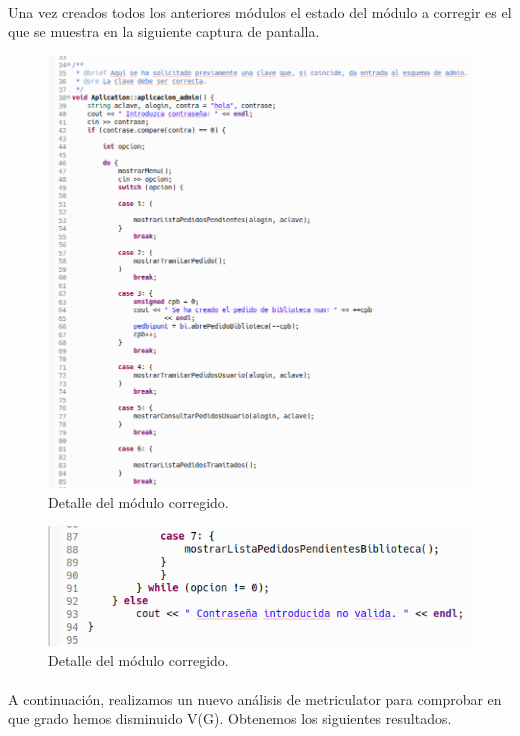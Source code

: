 			\paragraph{}Una vez creados todos los anteriores módulos el estado del módulo a corregir es el que se muestra en la siguiente captura de pantalla.
			
			\begin{figure}[H]
				\centering
				\includegraphics[scale=0.5]{img/captura108.png}
				\caption{Detalle del módulo corregido.}
				\label{captura108}
			\end{figure}
			
			\begin{figure}[H]
				\centering
				\includegraphics[scale=0.7]{img/captura109.png}
				\caption{Detalle del módulo corregido.}
				\label{captura109}
			\end{figure}
		
			\paragraph{}A continuación, realizamos un nuevo análisis de metriculator para comprobar en que grado hemos disminuido V(G). Obtenemos los siguientes resultados.
			
